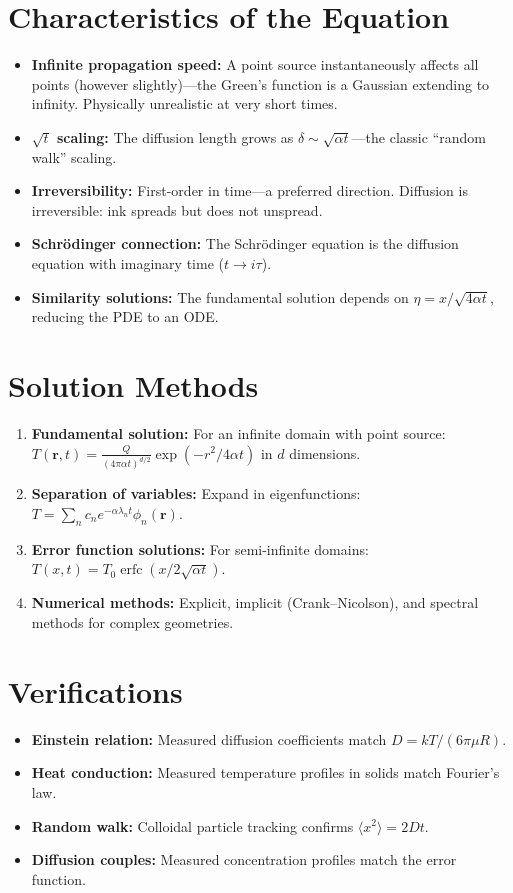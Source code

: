 \section*{Characteristics of the Equation}

\begin{itemize}
\item \textbf{Infinite propagation speed:} A point source instantaneously affects all points (however slightly)---the Green's function is a Gaussian extending to infinity. Physically unrealistic at very short times.
\item \textbf{$\sqrt{t}$ scaling:} The diffusion length grows as $\delta \sim \sqrt{\alpha t}$---the classic ``random walk'' scaling.
\item \textbf{Irreversibility:} First-order in time---a preferred direction. Diffusion is irreversible: ink spreads but does not unspread.
\item \textbf{Schr\"odinger connection:} The Schr\"odinger equation is the diffusion equation with imaginary time ($t \to i\tau$).
\item \textbf{Similarity solutions:} The fundamental solution depends on $\eta = x/\sqrt{4\alpha t}$, reducing the PDE to an ODE.
\end{itemize}
\section*{Solution Methods}

\begin{enumerate}
\item \textbf{Fundamental solution:} For an infinite domain with point source: $T(\mathbf{r}, t) = \frac{Q}{(4\pi \alpha t)^{d/2}} \exp(-r^2 / 4\alpha t)$ in $d$ dimensions.
\item \textbf{Separation of variables:} Expand in eigenfunctions: $T = \sum_n c_n e^{-\alpha \lambda_n t} \phi_n(\mathbf{r})$.
\item \textbf{Error function solutions:} For semi-infinite domains: $T(x, t) = T_0 \operatorname{erfc}(x / 2\sqrt{\alpha t})$.
\item \textbf{Numerical methods:} Explicit, implicit (Crank--Nicolson), and spectral methods for complex geometries.
\end{enumerate}
\section*{Verifications}

\begin{itemize}
\item \textbf{Einstein relation:} Measured diffusion coefficients match $D = kT/(6\pi\mu R)$.
\item \textbf{Heat conduction:} Measured temperature profiles in solids match Fourier's law.
\item \textbf{Random walk:} Colloidal particle tracking confirms $\langle x^2 \rangle = 2Dt$.
\item \textbf{Diffusion couples:} Measured concentration profiles match the error function.
\end{itemize}
